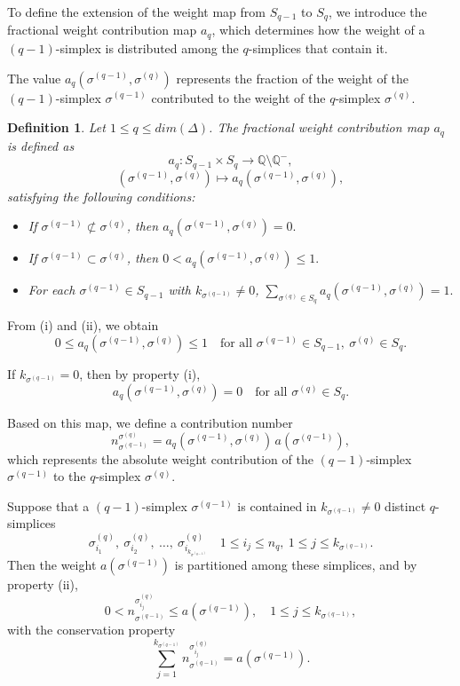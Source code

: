 \documentclass[12pt]{article}
\theoremstyle{normalhead_nobrackets}
\newtheorem{definition}{Definition}[section]
\theoremstyle{exampstyle}
\begin{document}
To define the extension of the weight map from $S_{q-1}$ to $S_q$, we introduce the fractional weight contribution map $a_q$, which determines how the weight of a $(q-1)$-simplex is distributed among the $q$-simplices that contain it.

The value $a_q(\sigma^{(q-1)}, \sigma^{(q)})$ represents the fraction of the weight of the $(q-1)$-simplex $\sigma^{(q-1)}$ contributed to the weight of the $q$-simplex $\sigma^{(q)}$.

\begin{definition}
Let $1 \le q \le dim(\Delta)$. The fractional weight contribution map $a_q$ is defined as
\[
a_q : S_{q-1} \times S_q \longrightarrow \mathbb{Q} \setminus \mathbb{Q}^-,
\]
\[
(\sigma^{(q-1)}, \sigma^{(q)}) \longmapsto a_q(\sigma^{(q-1)}, \sigma^{(q)}),
\]
satisfying the following conditions:

\begin{itemize}
    \item[(i)]\label{1property_a_q_1} If $\sigma^{(q-1)} \not\subset \sigma^{(q)}$, then
    \(
    a_q(\sigma^{(q-1)}, \sigma^{(q)}) = 0.
    \)

    \item[(ii)]\label{1property_a_q_2} If $\sigma^{(q-1)} \subset \sigma^{(q)}$, then
    \(
    0 < a_q(\sigma^{(q-1)}, \sigma^{(q)}) \le 1.
    \)

    \item[(iii)]\label{1property_a_q_3} For each $\sigma^{(q-1)} \in S_{q-1}$ with $k_{\sigma^{(q-1)}} \neq 0$,
    \(
    \sum_{\sigma^{(q)} \in S_q}
    a_q(\sigma^{(q-1)}, \sigma^{(q)}) = 1.
    \)
\end{itemize}
\end{definition}

From (i) and (ii), we obtain
\[
0 \le a_q(\sigma^{(q-1)}, \sigma^{(q)}) \le 1
\quad
\text{for all } \sigma^{(q-1)} \in S_{q-1},\ \sigma^{(q)} \in S_q.
\]

If $k_{\sigma^{(q-1)}} = 0$, then by property (i),
    \[
    a_q(\sigma^{(q-1)}, \sigma^{(q)}) = 0
    \quad
    \text{for all } \sigma^{(q)} \in S_q.
    \]

Based on this map, we define a contribution number
\[
n^{\sigma^{(q)}}_{\sigma^{(q-1)}}
=
a_q(\sigma^{(q-1)}, \sigma^{(q)}) \, a(\sigma^{(q-1)}),
\]
which represents the absolute weight contribution of the $(q-1)$-simplex $\sigma^{(q-1)}$ to the $q$-simplex $\sigma^{(q)}$.

Suppose that a $(q-1)$-simplex $\sigma^{(q-1)}$ is contained in
$k_{\sigma^{(q-1)}} \neq 0$ distinct $q$-simplices
\[
\sigma^{(q)}_{i_1},\ \sigma^{(q)}_{i_2},\ \ldots,\ 
\sigma^{(q)}_{i_{k_{\sigma^{(q-1)}}}}
\quad
1 \le i_j \le n_{q},\ 
1 \le j \le k_{\sigma^{(q-1)}}.
\]
Then the weight $a(\sigma^{(q-1)})$ is partitioned among these simplices, and by property (ii),
\[
0 < n^{\sigma^{(q)}_{i_j}}_{\sigma^{(q-1)}} \le a(\sigma^{(q-1)}),
\quad
1 \le j \le k_{\sigma^{(q-1)}},
\]
with the conservation property
\[
\sum_{j=1}^{k_{\sigma^{(q-1)}}}
n^{\sigma^{(q)}_{i_j}}_{\sigma^{(q-1)}}
=
a(\sigma^{(q-1)}).
\]
\end{document}
